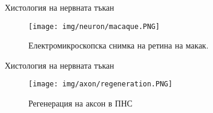 \begin{frame}[t]{Хистология на нервната тъкан}
  \begin{figure}[htbp!]
    \centering
    \texttt{[image: img/neuron/macaque.PNG]}
    \caption{Електромикроскопска снимка на ретина на макак. \cite[Фиг 1.3]{Neuron}}
  \end{figure}
\end{frame}

\begin{frame}[t]{Хистология на нервната тъкан}
  \begin{figure}[htbp!]
    \centering
    \texttt{[image: img/axon/regeneration.PNG]}
    \caption{Регенерация на аксон в ПНС \cite[Фиг 25.5]{Neuroscience}}
  \end{figure}
\end{frame}
